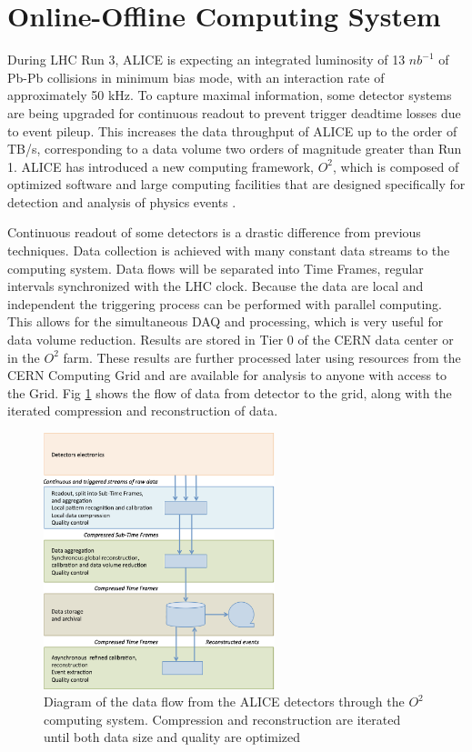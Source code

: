 \section{Online-Offline Computing System}

During LHC Run 3, ALICE is expecting an integrated luminosity of 13 ${nb}^{-1}$ of Pb-Pb collisions in minimum bias mode, with an interaction rate of approximately 50 kHz. To capture maximal information, some detector systems are being upgraded for continuous readout to prevent trigger deadtime losses due to event pileup. This increases the data throughput of ALICE up to the order of TB/s, corresponding to a data volume two orders of magnitude greater than Run 1. ALICE has introduced a new computing framework, $O^2$, which is composed of optimized software and large computing facilities that are designed specifically for detection and analysis of physics events \cite{O2_TDR}.

Continuous readout of some detectors is a drastic difference from previous techniques. Data collection is achieved with many constant data streams to the computing system. Data flows will be separated into Time Frames, regular intervals synchronized with the LHC clock. Because the data are local and independent the triggering process can be performed with parallel computing. This allows for the simultaneous DAQ and processing, which is very useful for data volume reduction. Results are stored in Tier 0 of the CERN data center or in the $O^2$ farm. These results are further processed later using resources from the CERN Computing Grid and are available for analysis to anyone with access to the Grid. Fig \ref{fig:O2_Schematic} shows the flow of data from detector to the grid, along with the iterated compression and reconstruction of data. 


\begin{figure}[H]
    \centering
    \includegraphics[width=0.6\textwidth]{figures/O2/O2_schematic.png}
    \caption{Diagram of the data flow from the ALICE detectors through the $O^2$ computing system. Compression and reconstruction are iterated until both data size and quality are optimized \cite{O2_TDR}}
    \label{fig:O2_Schematic}
\end{figure}

